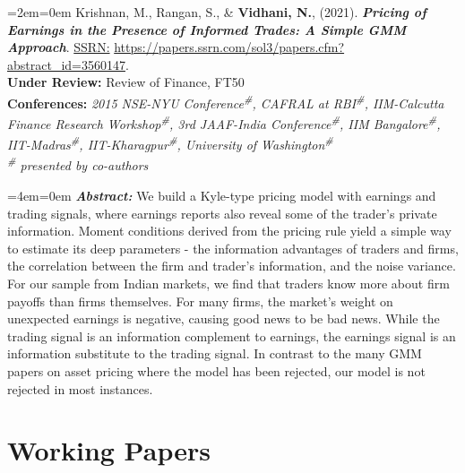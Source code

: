 \documentclass[11pt,a4paper,]{moderncv}
\begin{document}
%
  \par%
  \medskip
  \leftskip=2em\rightskip=0em%
  \noindent\ignorespaces
\leavevmode\hypertarget{ref-krishnan_rangan_vidhani_2020}{}
Krishnan, M., Rangan, S., \& \textbf{Vidhani, N.}, (2021). \textbf{\textit{Pricing of Earnings in the Presence of Informed Trades: A Simple GMM Approach}}. \underline{SSRN:} \url{https://papers.ssrn.com/sol3/papers.cfm?abstract_id=3560147}.\\
\textbf{Under Review:} Review of Finance, FT50\\
\textbf{Conferences:} \textit{2015 NSE-NYU Conference\textsuperscript{\#}, CAFRAL at RBI\textsuperscript{\#}, IIM-Calcutta Finance Research Workshop\textsuperscript{\#}, 3rd JAAF-India Conference\textsuperscript{\#}, IIM Bangalore\textsuperscript{\#}, IIT-Madras\textsuperscript{\#}, IIT-Kharagpur\textsuperscript{\#}, University of Washington\textsuperscript{\#}}\\
\textit{\textsuperscript{\#} presented by co-authors}
%
  \par\medskip

%
  \par%
  \medskip
  \leftskip=4em\rightskip=0em%
  \noindent\ignorespaces
\textbf{\textit{Abstract:}} We build a Kyle-type pricing model with earnings and trading signals, where earnings reports also reveal some of the trader's private information. Moment conditions derived from the pricing rule yield a simple way to estimate its deep parameters - the information advantages of traders and firms, the correlation between the firm and trader's information, and the noise variance. For our sample from Indian markets, we find that traders know more about firm payoffs than firms themselves. For many firms, the market's weight on unexpected earnings is negative, causing good news to be bad news. While the trading signal is an information complement to earnings, the earnings signal is an information substitute to the trading signal. In contrast to the many GMM papers on asset pricing where the model has been rejected, our model is not rejected in most instances.
%
  \par\medskip

\endgroup

\newpage

\hypertarget{working-papers}{%
\section{Working Papers}\label{working-papers}}

\begingroup
\setlength{\parindent}{-0.5in}
\setlength{\leftskip}{0.5in}
\end{document}
